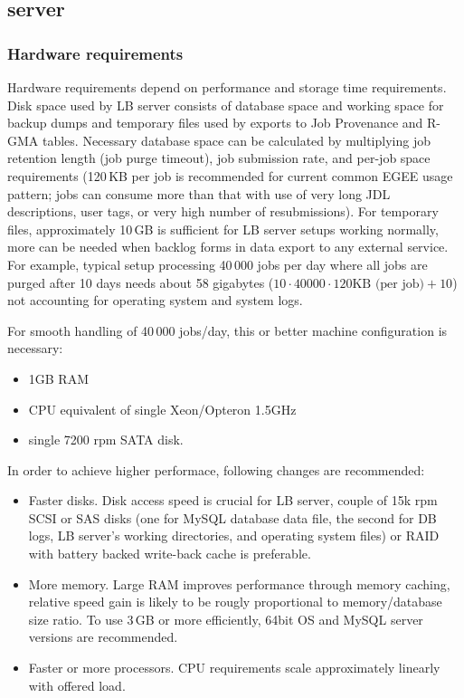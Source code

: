 \subsection{\LB server}

\subsubsection{Hardware requirements}
\label{inst:hw_req}

Hardware requirements depend on performance and storage time requirements.
Disk space used by LB server consists of database space and working space 
for backup dumps and temporary files used by exports to Job Provenance and
R-GMA tables. Necessary database space can be calculated by multiplying 
job retention length (job purge timeout), job submission rate, and  
per-job space requirements (120\,KB per job is recommended for current common 
EGEE usage pattern; jobs can consume more than that with use of very long
JDL descriptions, user tags, or very high number of resubmissions).
For temporary files, approximately 10\,GB is sufficient for LB server setups
working normally, more can be needed when backlog forms in data export
to any external service. For example, typical setup processing 40\,000 jobs per 
day where all jobs are purged after 10 days needs about 58 gigabytes
($10 \cdot 40000 \cdot 120 \mbox{KB (per job)} + 10$) not accounting for operating 
system and system logs.

For smooth handling of 40\,000 jobs/day, this or better machine configuration 
is necessary:
\begin{itemize}
\item 1GB RAM
\item CPU equivalent of single Xeon/Opteron 1.5GHz
\item single 7200 rpm SATA disk.
\end{itemize}
In order to achieve higher performace, following changes are recommended:
\begin{itemize}
\item Faster disks. Disk access speed is crucial for LB server, couple of 15k rpm
SCSI or SAS disks (one for MySQL database data file, the second for DB logs, LB server's
working directories, and operating system files) or RAID with battery backed 
write-back cache is preferable.
\item More memory. Large RAM improves performance through memory caching,
relative speed gain is likely to be rougly proportional to memory/database size ratio.
To use 3\,GB or more efficiently, 64bit OS and MySQL server versions are recommended.
\item Faster or more processors. CPU requirements scale approximately linearly with
offered load.
\end{itemize}

